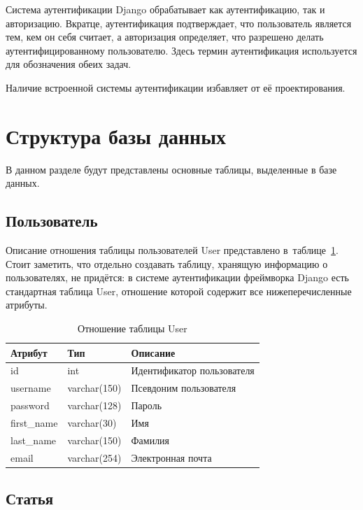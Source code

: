 Система аутентификации Django обрабатывает как аутентификацию, так и авторизацию.
Вкратце, аутентификация подтверждает, что пользователь является тем, кем он себя считает, а авторизация определяет, что разрешено делать аутентифицированному пользователю.
Здесь термин аутентификация используется для обозначения обеих задач.

Наличие встроенной системы аутентификации избавляет от её проектирования.

\section{Структура базы данных}

В данном разделе будут представлены основные таблицы, выделенные в базе данных.

\subsection{Пользователь}

Описание отношения таблицы пользователей User представлено в~таблице~\ref{tbl:auth_user}.
Стоит заметить, что отдельно создавать таблицу, хранящую информацию о пользователях, не придётся: в системе аутентификации фреймворка Django есть стандартная таблица User, отношение которой содержит все нижеперечисленные атрибуты.

\begin{table}[H]
	\centering
	\caption{Отношение таблицы User}
	\label{tbl:auth_user}
	\begin{tabular}{|l|l|l|}
		\hline
		\textbf{Атрибут} & \textbf{Тип} & \textbf{Описание}          \\ \hline
		id               & int          & Идентификатор пользователя \\ \hline
		username         & varchar(150) & Псевдоним пользователя     \\ \hline
		password         & varchar(128) & Пароль                     \\ \hline
		first\_name      & varchar(30)  & Имя                        \\ \hline
		last\_name       & varchar(150) & Фамилия                    \\ \hline
		email            & varchar(254) & Электронная почта          \\ \hline
	\end{tabular}
\end{table}

\subsection{Статья}

